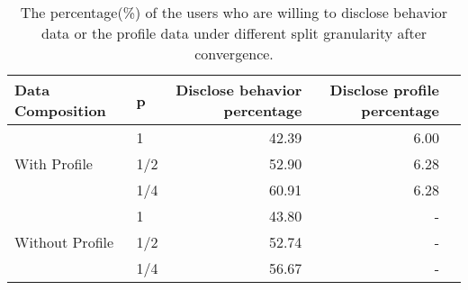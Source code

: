 \begin{table}
    \centering
    \caption{The percentage(\%) of the users who are willing to disclose behavior data or the profile data under different split granularity after convergence. 
    }
    \label{tab:profile_gru_results}
    \begin{adjustbox}{max width=\linewidth}
    \begin{tabular}{@{}llrrr@{}}
\toprule
{Data Composition} & {p} & {Disclose behavior percentage}&{Disclose profile percentage} \\ 

\midrule
\multirow{3}{*}{{With Profile}} & {1} & 42.39 & 6.00   \\ 
& {1/2} &   52.90  &  6.28     \\
& {1/4} &   60.91  & 6.28    \\
\midrule
\multirow{3}{*}{{Without Profile}} & {1} & 43.80 & -   \\ 
& {1/2} &   52.74  &  -    \\
& {1/4} &   56.67  & -    \\

\bottomrule
\end{tabular}
\end{adjustbox}
\end{table}